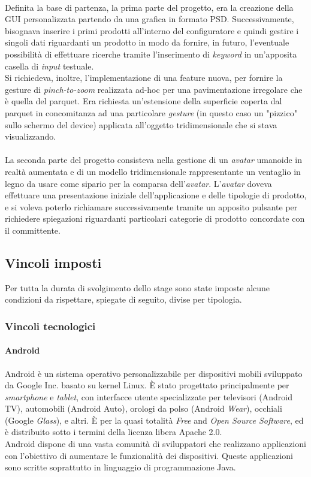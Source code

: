 \\
Definita la base di partenza, la prima parte del progetto, era la creazione della GUI personalizzata partendo da una grafica in formato PSD. Successivamente, bisognava inserire i primi prodotti all'interno del configuratore e quindi gestire i singoli dati riguardanti un prodotto in modo da fornire, in futuro, l'eventuale possibilit\`a di effettuare ricerche tramite l'inserimento di \textit{keyword} in un'apposita casella di \textit{input} testuale.
\\
Si richiedeva, inoltre, l'implementazione di una feature nuova, per fornire la gesture di \textit{pinch-to-zoom} realizzata ad-hoc per una pavimentazione irregolare che \`e quella del parquet. Era richiesta un'estensione della superficie coperta dal parquet in concomitanza ad una particolare \textit{gesture} (in questo caso un "pizzico" sullo schermo del device) applicata all'oggetto tridimensionale che si stava visualizzando.
\\
\\
La seconda parte del progetto consisteva nella gestione di un \textit{avatar\gloss} umanoide in realt\`a aumentata e di un modello tridimensionale rappresentante un ventaglio in legno da usare come sipario per la comparsa dell'\textit{avatar\gloss}. L'\textit{avatar\gloss} doveva effettuare una presentazione iniziale dell'applicazione e delle tipologie di prodotto, e si voleva poterlo richiamare successivamente tramite un apposito pulsante per richiedere spiegazioni riguardanti particolari categorie di prodotto concordate con il committente.

\subsection{Vincoli imposti}
Per tutta la durata di svolgimento dello stage sono state imposte alcune condizioni da rispettare, spiegate di seguito, divise per tipologia.

\subsubsection{Vincoli tecnologici}
\paragraph{Android}
Android è un sistema operativo personalizzabile per dispositivi mobili sviluppato da Google Inc. basato su kernel Linux.
È stato progettato principalmente per \textit{smartphone} e \textit{tablet}, con interfacce utente specializzate per televisori (Android TV), automobili (Android Auto), orologi da polso (Android \textit{Wear}), occhiali (Google \textit{Glass}), e altri.
È per la quasi totalità \textit{Free} and \textit{Open Source Software}, ed è distribuito sotto i termini della licenza libera Apache 2.0.\\
Android dispone di una vasta comunità di sviluppatori che realizzano applicazioni con l'obiettivo di aumentare le funzionalità dei dispositivi. Queste applicazioni sono scritte soprattutto in linguaggio di programmazione Java.
\\

